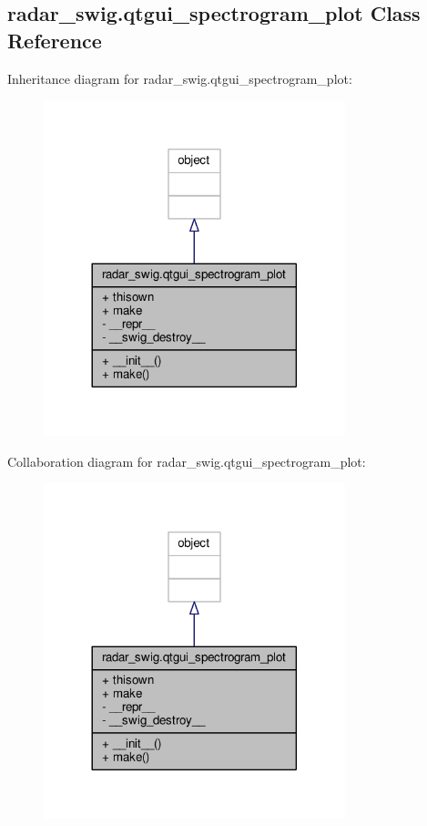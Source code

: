 \subsection{radar\+\_\+swig.\+qtgui\+\_\+spectrogram\+\_\+plot Class Reference}
\label{classradar__swig_1_1qtgui__spectrogram__plot}


Inheritance diagram for radar\+\_\+swig.\+qtgui\+\_\+spectrogram\+\_\+plot\+:
\nopagebreak
\begin{figure}[H]
\begin{center}
\leavevmode
\includegraphics[width=248pt]{d9/dde/classradar__swig_1_1qtgui__spectrogram__plot__inherit__graph}
\end{center}
\end{figure}


Collaboration diagram for radar\+\_\+swig.\+qtgui\+\_\+spectrogram\+\_\+plot\+:
\nopagebreak
\begin{figure}[H]
\begin{center}
\leavevmode
\includegraphics[width=248pt]{d1/dfb/classradar__swig_1_1qtgui__spectrogram__plot__coll__graph}
\end{center}
\end{figure}
